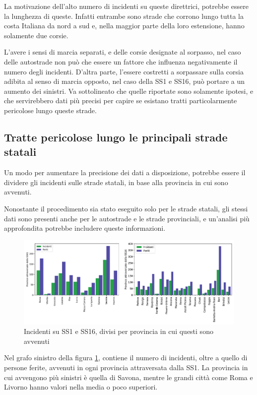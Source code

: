 \documentclass[a4paper,12pt]{report}
\begin{document}
La motivazione dell'alto numero di incidenti su queste direttrici, potrebbe essere 
la lunghezza di queste. Infatti entrambe sono strade che corrono lungo tutta la 
costa Italiana da nord a sud e, nella maggior parte della loro estensione, 
hanno solamente due corsie.

L'avere i sensi di marcia separati, e delle corsie designate al sorpasso, nel caso 
delle autostrade non può che essere un fattore che influenza negativamente 
il numero degli incidenti. 
D'altra parte, l'essere costretti a sorpassare sulla corsia adibita al senso di 
marcia opposto, nel caso della SS1 e SS16, può portare a un aumento dei 
sinistri.
Va sottolineato che quelle riportate sono solamente ipotesi, e che servirebbero 
dati più precisi per capire se esistano tratti particolarmente 
pericolose lungo queste strade.

\subsection{Tratte pericolose lungo le principali strade statali}

Un modo per aumentare la precisione dei dati a disposizione, potrebbe essere il 
dividere gli incidenti sulle strade statali, in base alla provincia in cui sono avvenuti.

Nonostante il procedimento sia stato eseguito solo per le strade statali, gli stessi dati 
sono presenti anche per le autostrade e le strade provinciali, e un'analisi più 
approfondita potrebbe includere queste informazioni.
\begin{figure}
    \includegraphics[width=\linewidth]{img_unite/tratti_ss1_ss16.png}
    \caption{Incidenti su SS1 e SS16, divisi per provincia in cui questi sono avvenuti}
    \label{fig:incidenti-strade-statali}
\end{figure}

Nel grafo sinistro della figura \ref{fig:incidenti-strade-statali}, contiene il numero di 
incidenti, oltre a quello di persone ferite, avvenuti in ogni provincia attraversata dalla SS1. 
La provincia in cui avvengono più sinistri è quella di Savona, mentre le grandi città come 
Roma e Livorno hanno valori nella media o poco superiori.
\end{document}
